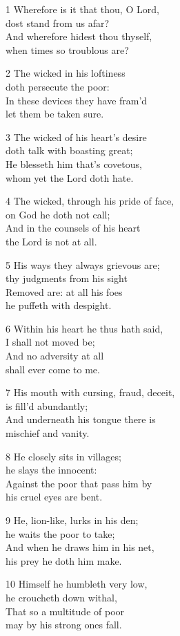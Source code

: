 1 Wherefore is it that thou, O Lord,\\
dost stand from us afar?\\
And wherefore hidest thou thyself,\\
when times so troublous are?

2 The wicked in his loftiness\\
doth persecute the poor:\\
In these devices they have fram’d\\
let them be taken sure.

3 The wicked of his heart’s desire\\
doth talk with boasting great;\\
He blesseth him that’s covetous,\\
whom yet the Lord doth hate.

4 The wicked, through his pride of face,\\
on God he doth not call;\\
And in the counsels of his heart\\
the Lord is not at all.

5 His ways they always grievous are;\\
thy judgments from his sight\\
Removed are: at all his foes\\
he puffeth with despight.

6 Within his heart he thus hath said,\\
I shall not moved be;\\
And no adversity at all\\
shall ever come to me.

7 His mouth with cursing, fraud, deceit,\\
is fill’d abundantly;\\
And underneath his tongue there is\\
mischief and vanity.

8 He closely sits in villages;\\
he slays the innocent:\\
Against the poor that pass him by\\
his cruel eyes are bent.

9 He, lion-like, lurks in his den;\\
he waits the poor to take;\\
And when he draws him in his net,\\
his prey he doth him make.

10 Himself he humbleth very low,\\
he croucheth down withal,\\
That so a multitude of poor\\
may by his strong ones fall.

